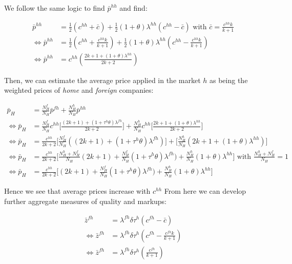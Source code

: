 We follow the same logic to find $\bar{p}^{hh}$ and find: 

\begin{align*}
\bar{p}^{hh} &= \frac{1}{2}( c^{hh} +  \bar{c}) + \frac{1}{2} (1 + \theta)\lambda^{hh}(c^{hh} - \bar{c}) \text{ with } \bar{c} = \frac{c^{hh}k}{k+1} \\
\Longleftrightarrow  \bar{p}^{hh} &= \frac{1}{2}\left( c^{hh} + \frac{c^{hh}k}{k+1}\right) + \frac{1}{2} (1 + \theta)\lambda^{hh} \left(c^{hh} - \frac{c^{hh}k}{k+1} \right)\\
\Longleftrightarrow \bar{p}^{hh} &= c^{hh} \left(\frac{2k +1 + (1 + \theta)\lambda^{hh}}{2k + 2} \right)
\end{align*}

Then, we can estimate the average price applied in the market $h$ as being the weighted prices of \textit{home} and \textit{foreign} companies: 

\begin{align*}
    \bar{p}_H &= \frac{N_H^f}{N_H} \bar{p}^{fh} + \frac{N_H^h}{N_H} \bar{p}^{hh} \\
    \Longleftrightarrow \bar{p}_H &= \frac{N_H^f}{N_H} c^{hh} \Bigg[\frac{(2k +1) + (1 + \tau^h\theta)\lambda^{fh}}{2k+2} \Bigg] + \frac{N_H^h}{N_H}c^{hh} \Bigg[\frac{2k +1 + (1 + \theta)\lambda^{hh}}{2k + 2} \Bigg] \\
    \Longleftrightarrow \bar{p}_H &= \frac{c^{hh}}{2k +2} \Bigg[\frac{N_H^f}{N_H} ((2k +1) + (1 + \tau^h\theta)\lambda^{fh})\Bigg] + \Bigg[\frac{N_H^h}{N_H}(2k +1 + (1 + \theta)\lambda^{hh})\Bigg] \\
    \Longleftrightarrow \bar{p}_H &= \frac{c^{hh}}{2k +2} \Bigg[\frac{N_H^h + N_H^f}{N_H}(2k +1) + \frac{N_H^f}{N_H}(1 + \tau^h\theta)\lambda^{fh}) + \frac{N_H^h}{N_H} (1 + \theta)\lambda^{hh}\Bigg] \text{ with } \frac{N_H^h + N_H^f}{N_H} = 1\\
    \Longleftrightarrow \bar{p}_H &= \frac{c^{hh}}{2k +2} \Bigg[(2k +1) + \frac{N_H^f}{N_H}(1 + \tau^h\theta)\lambda^{fh}) + \frac{N_H^h}{N_H} (1 + \theta)\lambda^{hh}\Bigg] 
\end{align*}

Hence we see that average prices increase with $c^{hh}$
From here we can develop further aggregate measures of quality and markups: 

\begin{align*}
     \bar{z}^{fh} &= \lambda^{fh}\delta \tau^h(c^{fh} - \bar{c}) \\
     \Longleftrightarrow \bar{z}^{fh} &= \lambda^{fh}\delta \tau^h(c^{fh} - \frac{c^{fh}k}{k+1}) \\
     \Longleftrightarrow \bar{z}^{fh} &= \lambda^{fh}\delta \tau^h \left(\frac{c^{fh}}{k+1}\right)
\end{align*}

